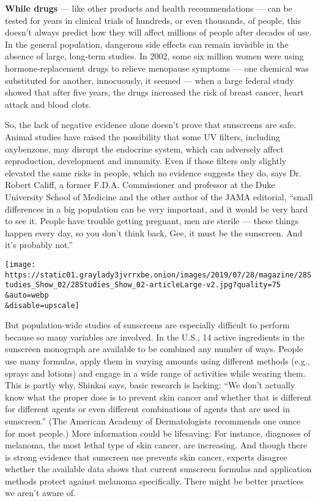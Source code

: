 \textbf{While drugs} --- like other products and health recommendations
--- can be tested for years in clinical trials of hundreds, or even
thousands, of people, this doesn't always predict how they will affect
millions of people after decades of use. In the general population,
dangerous side effects can remain invisible in the absence of large,
long-term studies. In 2002, some six million women were using
hormone-replacement drugs to relieve menopause symptoms --- one chemical
was substituted for another, innocuously, it seemed --- when a large
federal study showed that after five years, the drugs increased the risk
of breast cancer, heart attack and blood clots.

So, the lack of negative evidence alone doesn't prove that sunscreens
are safe. Animal studies have raised the possibility that some UV
filters, including oxybenzone, may disrupt the endocrine system, which
can adversely affect reproduction, development and immunity. Even if
those filters only slightly elevated the same risks in people, which no
evidence suggests they do, says Dr. Robert Califf, a former F.D.A.
Commissioner and professor at the Duke University School of Medicine and
the other author of the JAMA editorial, ``small differences in a big
population can be very important, and it would be very hard to see it.
People have trouble getting pregnant, men are sterile --- these things
happen every day, so you don't think back, Gee, it must be the
sunscreen. And it's probably not.''

\texttt{[image: https://static01.graylady3jvrrxbe.onion/images/2019/07/28/magazine/28Studies\_Show\_02/28Studies\_Show\_02-articleLarge-v2.jpg?quality=75\\\&auto=webp\\\&disable=upscale]}

But population-wide studies of sunscreens are especially difficult to
perform because so many variables are involved. In the U.S., 14 active
ingredients in the sunscreen monograph are available to be combined any
number of ways. People use many formulas, apply them in varying amounts
using different methods (e.g., sprays and lotions) and engage in a wide
range of activities while wearing them. This is partly why, Shinkai
says, basic research is lacking: ``We don't actually know what the
proper dose is to prevent skin cancer and whether that is different for
different agents or even different combinations of agents that are used
in sunscreen.'' (The American Academy of Dermatologists recommends one
ounce for most people.) More information could be lifesaving: For
instance, diagnoses of melanoma, the most lethal type of skin cancer,
are increasing. And though there is strong evidence that sunscreen use
prevents skin cancer, experts disagree whether the available data shows
that current sunscreen formulas and application methods protect against
melanoma specifically. There might be better practices we aren't aware
of.


